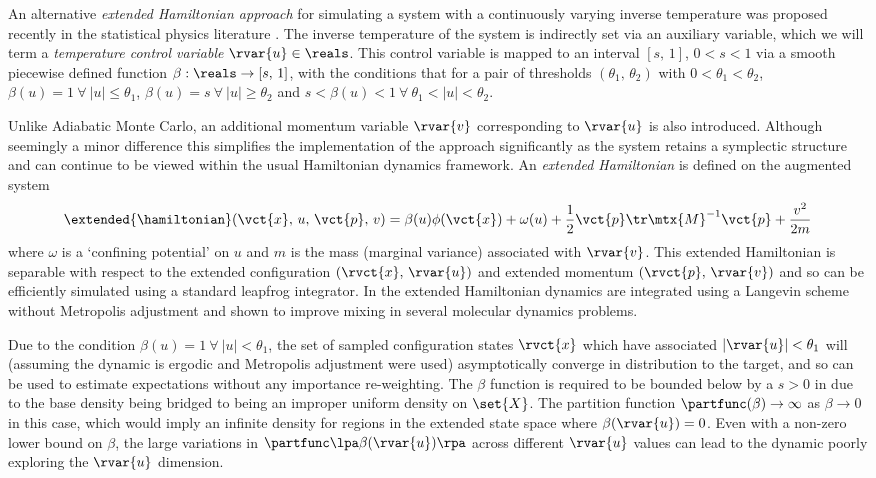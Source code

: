 An alternative \emph{extended Hamiltonian approach} for simulating a system with a continuously varying inverse temperature was proposed recently in the statistical physics literature \citep{gobbo2015extended}. The inverse temperature of the system is indirectly set via an auxiliary variable, which we will term a \emph{temperature control variable} $\rvar{u} \in \reals$. This control variable is mapped to an interval $[s,\,1]$, $0 < s < 1$ via a smooth piecewise defined function $\beta : \reals \to [s,\,1]$, with the conditions that for a pair of thresholds $(\theta_1,\,\theta_2)$ with $0 < \theta_1 < \theta_2$, $\beta(u) = 1 ~\forall~ |u| \leq \theta_1$, $\beta(u) = s ~\forall~ |u| \geq \theta_2$ and $s < \beta(u) < 1 ~\forall~ \theta_1 < |u| < \theta_2$.

Unlike Adiabatic Monte Carlo, an additional momentum variable $\rvar{v}$ corresponding to $\rvar{u}$ is also introduced. Although seemingly a minor difference this simplifies the implementation of the approach significantly as the system retains a symplectic structure and can continue to be viewed within the usual Hamiltonian dynamics framework. An \emph{extended Hamiltonian} is defined on the augmented system
\begin{equation}\label{eq:extended-hamiltonian-gobbo-leimkuhler}
  \extended{\hamiltonian}(\vct{x},\,u,\,\vct{p},\,v) = 
  \beta(u) \phi(\vct{x}) + \omega(u) + \frac{1}{2} \vct{p}\tr\mtx{M}^{-1}\vct{p} + \frac{v^2}{2m}
\end{equation}
where $\omega$ is a `confining potential' on $u$ and $m$ is the mass (marginal variance) associated with $\rvar{v}$. This extended Hamiltonian is separable with respect to the extended configuration $(\rvct{x},\,\rvar{u})$ and extended momentum $(\rvct{p},\,\rvar{v})$ and so can be efficiently simulated using a standard leapfrog integrator. In \cite{gobbo2015extended} the extended Hamiltonian dynamics are integrated using a Langevin scheme without Metropolis adjustment and shown to improve mixing in several molecular dynamics problems. 

Due to the condition $\beta(u) = 1 ~\forall~ |u| < \theta_1$, the set of sampled configuration states $\rvct{x}$ which have associated $|\rvar{u}| < \theta_1$ will (assuming the dynamic is ergodic and Metropolis adjustment were used) asymptotically converge in distribution to the target, and so can be used to estimate expectations without any importance re-weighting. The $\beta$ function is required to be bounded below by a $s > 0$ in \citep{gobbo2015extended} due to the base density being bridged to being an improper uniform density on $\set{X}$. The partition function $\partfunc(\beta) \to \infty$ as $\beta \to  0$ in this case, which would imply an infinite density for regions in the extended state space where $\beta(\rvar{u}) = 0$. Even with a non-zero lower bound on $\beta$, the large variations in $\partfunc\lpa\beta(\rvar{u})\rpa$  across different $\rvar{u}$ values can lead to the dynamic poorly exploring the $\rvar{u}$ dimension. 


